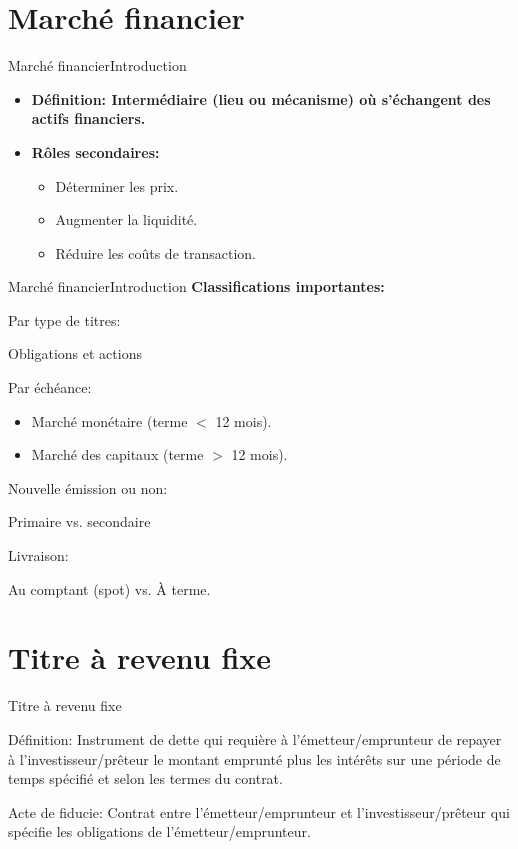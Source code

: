 \documentclass{beamer}
\begin{document}
\section{Marché financier}
\begin{frame}{Marché financier}{Introduction}
\begin{itemize}
\item \textbf{Définition: Intermédiaire (lieu ou mécanisme) où s’échangent des actifs financiers.}
\item \textbf{Rôles secondaires:}
\begin{itemize}
\item Déterminer les prix.
\item Augmenter la liquidité.
\item Réduire les coûts de transaction.
\end{itemize}
\end{itemize}
\end{frame}

\begin{frame}{Marché financier}{Introduction}
\textbf{Classifications importantes:}
\begin{block}{Par type de titres:}
\begin{itemize}
Obligations et actions
\end{itemize}
\end{block}
\begin{block}{Par échéance:}
\begin{itemize}
\item Marché monétaire (terme $<$ 12 mois).
\item Marché des capitaux (terme $>$ 12 mois).
\end{itemize}
\end{block}
\begin{block}{Nouvelle émission ou non:}
\begin{itemize}
Primaire vs.  secondaire
\end{itemize}
\end{block}
\begin{block}{Livraison:}
\begin{itemize}
Au comptant (spot) vs.  À terme.
\end{itemize}
\end{block}
\end{frame}

\section{Titre à revenu fixe}
\begin{frame}{Titre à revenu fixe}
\begin{block}{Définition:}
Instrument de dette qui requière à l’émetteur/emprunteur de repayer à l’investisseur/prêteur le montant emprunté plus les intérêts sur une période de temps spécifié et selon les termes du contrat.
\end{block}
\begin{block}{Acte de fiducie:}
Contrat entre l’émetteur/emprunteur et l’investisseur/prêteur qui spécifie les obligations de l’émetteur/emprunteur.
\end{block}
\end{frame}
\end{document}
